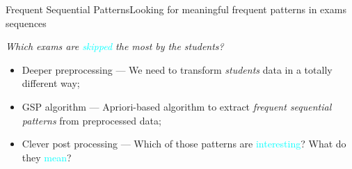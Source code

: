 \begin{frame}{Frequent Sequential Patterns}{Looking for meaningful frequent patterns in exams sequences}

     \vspace{0,1cm}\centering\textit{Which exams are \textcolor{cyan}{skipped} the most by the students?} \vspace{0,4cm}

\begin{block}{}
		\begin{itemize}
			\item<1-> \alert{Deeper preprocessing} --- We need to transform \emph{students} data in a totally different way;\vspace{0.2cm}
			\item<2-> \alert{GSP algorithm} --- Apriori-based algorithm to extract \emph{frequent sequential patterns} from preprocessed data;\vspace{0.2cm}
			\item<3-> \alert{Clever post processing} --- Which of those patterns are \textcolor{cyan}{interesting}? What do they \textcolor{cyan}{mean}?\vspace{0.2cm}
		\end{itemize}
	\end{block}

\end{frame}


